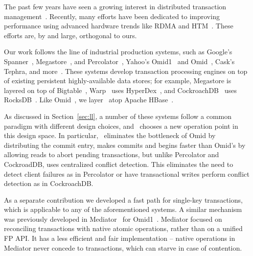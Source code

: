 

The past few years have seen a growing interest in distributed 
transaction management~\cite{PattersonENAA12,Cowling2012,Aguilera2015,Balakrishnan2013,Thomson2012,eyal2013ordering,Warp}.
Recently, many efforts have been dedicated to improving performance using advanced 
hardware trends like RDMA and HTM~\cite{Wei2015,Dragojevic2014,Dragojevic2015}.  
These efforts are, by and large, orthogonal to ours.

Our work follows the line of industrial production systems, such as 
Google's Spanner~\cite{Spanner2012}, Megastore~\cite{Megastore}, and Percolator~\cite{Percolator2010}, 
Yahoo's Omid1~\cite{OmidICDE2014} and Omid~\cite{Omid2017}, 
Cask's Tephra\cite{tephra}, and more~\cite{cockroach}.
These systems develop transaction processing engines on top of existing persistent 
highly-available data stores; for example, Megastore is layered on top of
Bigtable~\cite{Chang2008}, Warp~\cite{Warp} uses HyperDex~\cite{Escriva2012}, 
and CockroachDB~\cite{cockroach} uses RocksDB~\cite{rocksdb}.
Like  Omid~\cite{Omid2017}, we layer \sys\ atop Apache HBase~\cite{hbase}.

As discussed in Section~\ref{sec:ll}, a number of these systems follow a common paradigm
with different design choices, and \sys\ chooses a new operation point in 
this design space. In particular, \sys\ eliminates the bottleneck of Omid by
distributing the commit entry, makes commits and begins faster than Omid's by 
allowing reads to abort pending transactions, but unlike Percolator and CockroadDB, 
uses centralized conflict detection. This eliminates the need to detect client 
failures as in Percolator or have transactional writes perform conflict detection 
as in CockroachDB. 

As a separate contribution we developed a fast path for single-key transactions,
which is applicable to any of the aforementioned systems. A similar mechanism 
was previously developed in Mediator~\cite{mediator} for Omid1~\cite{OmidICDE2014}. Mediator focused on reconciling 
transactions with native atomic operations, rather than on a unified FP API. It has
a less efficient and fair implementation -- native operations in Mediator never concede to transactions, 
which can starve in case of contention. 

